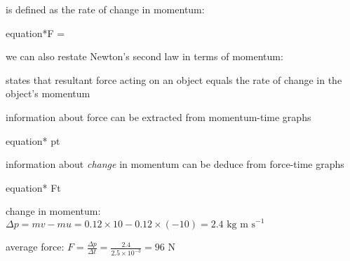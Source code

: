 \begin{ilight}
	\centering {} is defined as the rate of change in momentum: \begin{empheq}[box=\tcbhighmath]{equation*}{F = }\end{empheq}
\end{ilight}

we can also restate Newton's second law in terms of momentum:

\begin{ilight}
	 states that resultant force acting on an object equals the rate of change in the object's momentum
\end{ilight}

\cmt information about force can be extracted from momentum-time graphs

{
	\centering
	
	\begin{empheq}[box=\tcbhighmath]{equation*}{  p\text{-}t  }\end{empheq}
	
}

\cmt information about \emph{change} in momentum can be deduce from force-time graphs
	
{
	\centering

	\begin{empheq}[box=\tcbhighmath]{equation*}{  F\text{-}t  }\end{empheq}
	
}


\begin{soln} change in momentum: $\Delta p = mv - mu = 0.12 \times 10 - 0.12 \times (-10) = 2.4 \text{ kg m s}^{-1}$

average force: $F=\frac{\Delta p}{\Delta t} = \frac{2.4}{2.5 \times10^{-3}} = 96 \text{ N}$ \end{soln}


